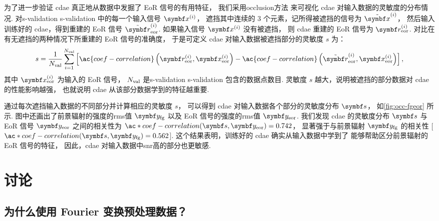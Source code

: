 为了进一步验证 \ac{cdae} 真正地从数据中发掘了 EoR 信号的有用特征，
我们采用\ac{occlusion}方法\cite{zeiler2014}
来可视化 \ac{cdae} 对输入数据的灵敏度的分布情况.
对\acl{s-validation} \ac{s-validation} 中的每一个输入信号 $\B{x}^{(i)}$，
遮挡其中连续的 3 个元素，记所得被遮挡的信号为 $\tilde{\B{x}}^{(i)}$，
然后输入训练好的 \ac{cdae}，得到重建的 EoR 信号 $\tilde{\B{r}}^{(i)}_{\R{eor}}$.
如果输入信号 $\B{x}^{(i)}$ 没有被遮挡，
则 \ac{cdae} 重建的 EoR 信号为 $\B{r}^{(i)}_{\R{eor}}$.
对比在有无遮挡的两种情况下所重建的 EoR 信号的准确度，
于是可定义 \ac{cdae} 对输入数据被遮挡部分的灵敏度 $s$ 为：
\begin{equation}
  \label{eq:perf-loss}
  s = \frac{1}{N_{\R{val}}} \sum_{i=1}^{N_{\R{val}}} \left[
      \ac{coef-correlation} \left(
        \B{r}^{(i)}_{\R{eor}}, \B{x}^{(i)}_{\R{eor}}
      \right) -
      \ac{coef-correlation} \left(
        \tilde{\B{r}}^{(i)}_{\R{eor}}, \B{x}^{(i)}_{\R{eor}}
      \right)
    \right] ,
\end{equation}
其中 $\B{x}^{(i)}_{\R{eor}}$ 为输入的 EoR 信号，
$N_{\mathrm{val}}$ 是\acl{s-validation} \ac{s-validation} 包含的数据点数目.
灵敏度 $s$ 越大，说明被遮挡的部分数据对 \ac{cdae} 的性能影响越强，
也就说明 \ac{cdae} 从该部分数据学到的特征越重要.

通过每次遮挡输入数据的不同部分并计算相应的灵敏度 $s$，
可以得到 \ac{cdae} 对输入数据各个部分的灵敏度分布 $\B{s}$，
如\autoref{fig:occ-fgeor} 所示.
图中还画出了前景辐射的强度的\acs*{rms}值 $\B{y}_{\R{fg}}$
以及 EoR 信号的强度的\acs*{rms}值 $\B{y}_{\R{eor}}$.
我们发现 \ac{cdae} 的灵敏度分布 $\B{s}$ 与 EoR 信号 $\B{y}_{\R{eor}}$
之间的相关性为 $\ac*{coef-correlation}(\B{s}, \B{y}_{\R{eor}}) = 0.742$，
显著强于与前景辐射 $\B{y}_{\R{fg}}$ 的相关性
[$\ac*{coef-correlation}(\B{s}, \B{y}_{\R{fg}}) = 0.562$].
这个结果表明，训练好的 \ac{cdae} 确实从输入数据中学到了
能够帮助区分前景辐射的 EoR 信号的特征，
因此，\ac{cdae} 对输入数据中\ac{snr}高的部分也更敏感.


\section{讨论}

\subsection{为什么使用 Fourier 变换预处理数据？}
\label{sec:why-ft}

